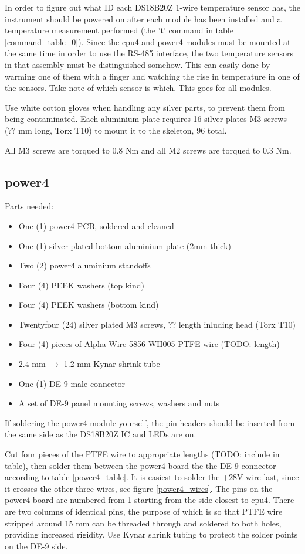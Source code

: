 \documentclass{article}
\begin{document}
In order to figure out what ID each DS18B20Z 1-wire temperature sensor has,
the instrument should be powered on after each module has been installed and
a temperature measurement performed (the 't' command in table \ref{command_table_0}).
Since the cpu4 and power4 modules must be mounted at the same time in order to use the RS-485 interface,
the two temperature sensors in that assembly must be distinguished somehow.
This can easily done by warming one of them with a finger and watching the rise in temperature in one of the sensors.
Take note of which sensor is which.
This goes for all modules.

Use white cotton gloves when handling any silver parts, to prevent them from being contaminated.
Each aluminium plate requires 16 silver plates M3 screws (?? mm long, Torx T10) to mount it to the skeleton, 96 total.

All M3 screws are torqued to 0.8 Nm and all M2 screws are torqued to 0.3 Nm.

\subsection{power4}

Parts needed:

\begin{itemize}
\item One (1) power4 PCB, soldered and cleaned
\item One (1) silver plated bottom aluminium plate (2mm thick)
\item Two (2) power4 aluminium standoffs
\item Four (4) PEEK washers (top kind)
\item Four (4) PEEK washers (bottom kind)
\item Twentyfour (24) silver plated M3 screws, ?? length inluding head (Torx T10)
\item Four (4) pieces of Alpha Wire 5856 WH005 PTFE wire (TODO: length)
\item 2.4 mm $\rightarrow$ 1.2 mm Kynar shrink tube
\item One (1) DE-9 male connector
\item A set of DE-9 panel mounting screws, washers and nuts
\end{itemize}

If soldering the power4 module yourself,
the pin headers should be inserted from the same side as the DS18B20Z IC and LEDs are on.

Cut four pieces of the PTFE wire to appropriate lengths (TODO: include in table),
then solder them between the power4 board the the DE-9 connector according to table \ref{power4_table}.
It is easiest to solder the +28V wire last, since it crosses the other three wires,
see figure \ref{power4_wires}.
The pins on the power4 board are numbered from 1 starting from the side closest to cpu4.
There are two columns of identical pins,
the purpose of which is so that PTFE wire stripped around 15 mm can be threaded through and soldered to both holes,
providing increased rigidity.
Use Kynar shrink tubing to protect the solder points on the DE-9 side.
\end{document}
